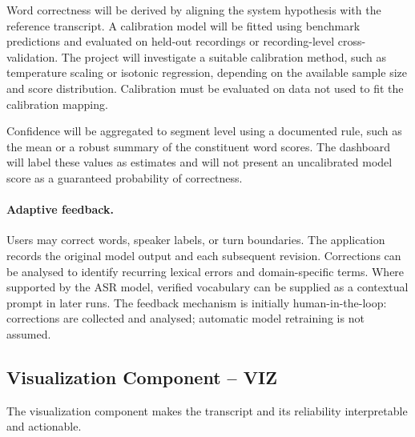 \documentclass[11pt,a4paper]{article}
\begin{document}
Word correctness will be derived by aligning the system hypothesis with the
reference transcript. A calibration model will be fitted using benchmark
predictions and evaluated on held-out recordings or recording-level
cross-validation. The project will investigate a suitable calibration method,
such as temperature scaling or isotonic regression, depending on the
available sample size and score distribution. Calibration must be evaluated
on data not used to fit the calibration mapping.

Confidence will be aggregated to segment level using a documented rule,
such as the mean or a robust summary of the constituent word scores. The
dashboard will label these values as estimates and will not present an
uncalibrated model score as a guaranteed probability of correctness.

\paragraph{Adaptive feedback.}
Users may correct words, speaker labels, or turn boundaries. The application
records the original model output and each subsequent revision. Corrections
can be analysed to identify recurring lexical errors and domain-specific
terms. Where supported by the ASR model, verified vocabulary can be supplied
as a contextual prompt in later runs. The feedback mechanism is initially
human-in-the-loop: corrections are collected and analysed; automatic model
retraining is not assumed.

\subsection{Visualization Component -- VIZ}

The visualization component makes the transcript and its reliability
interpretable and actionable.
\end{document}
